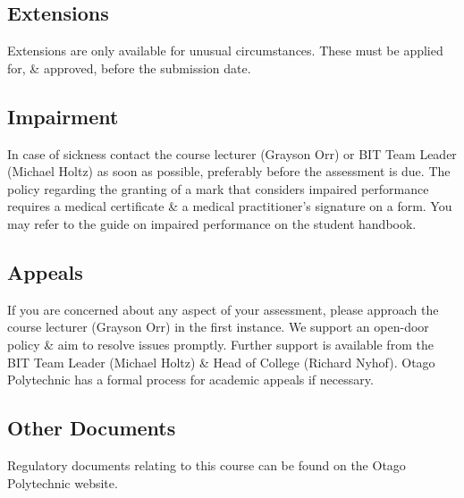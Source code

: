 \documentclass{article}
\begin{document}
\subsection*{Extensions}
Extensions are only available for unusual circumstances. These must be applied for, \& approved, before the submission date.

\subsection*{Impairment}
In case of sickness contact the course lecturer (Grayson Orr) or BIT Team Leader (Michael Holtz) as soon as possible, preferably before the assessment is due. The policy regarding the granting of a mark that considers impaired performance requires a medical certificate \& a medical practitioner’s signature on a form. You may refer to the guide on impaired performance on the student handbook.

\subsection*{Appeals}
If you are concerned about any aspect of your assessment, please approach the course lecturer (Grayson Orr) in the first instance. We support an open-door policy \& aim to resolve issues promptly. Further support is available from the BIT Team Leader (Michael Holtz) \& Head of College (Richard Nyhof). Otago Polytechnic has a formal process for academic appeals if necessary.

\subsection*{Other Documents}
Regulatory documents relating to this course can be found on the Otago Polytechnic website.
\end{document}
